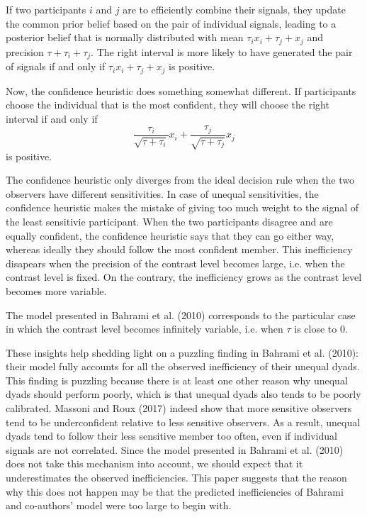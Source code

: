 \documentclass[12pt]{report}
\begin{document}
If two participants $i$ and $j$ are to efficiently combine their signals, they update the common prior belief based on the pair of individual signals, leading to a posterior belief that is normally distributed with mean $\tau_i x_i + \tau_j + x_j$ and precision $\tau + \tau_i + \tau_j$. The right interval is more likely to have generated the pair of signals if and only if $\tau_i x_i + \tau_j + x_j$ is positive. 

Now, the confidence heuristic does something somewhat different. If participants choose the individual that is the most confident, they will choose the right interval if and only if $$ \frac{\tau_i}{\sqrt{\tau+\tau_i}} x_i + \frac{\tau_j}{\sqrt{\tau+\tau_j}} x_j $$ is positive. 

The confidence heuristic only diverges from the ideal decision rule when the two observers have different sensitivities. In case of unequal sensitivities, the confidence heuristic makes the mistake of giving too much weight to the signal of the least sensitivie participant. When the two participants disagree and are equally confident, the confidence heuristic says that they can go either way, whereas ideally they should follow the most confident member. This inefficiency disapears when the precision of the contrast level becomes large, i.e. when the contrast level is fixed. On the contrary, the inefficiency grows as the contrast level becomes more variable. 

The model presented in Bahrami et al. (2010) corresponds to the particular case in which the contrast level becomes infinitely variable, i.e. when $\tau$ is close to 0. 

These insights help shedding light on a puzzling finding in Bahrami et al. (2010): their model fully accounts for all the observed inefficiency of their unequal dyads. This finding is puzzling because there is at least one other reason why unequal dyads should perform poorly, which is that unequal dyads also tends to be poorly calibrated. Massoni and Roux (2017) indeed show that more sensitive observers tend to be underconfident relative to less sensitive observers. As a result, unequal dyads tend to follow their less sensitive member too often, even if individual signals are not correlated. Since the model presented in Bahrami et al. (2010) does not take this mechanism into account, we should expect that it underestimates the observed inefficiencies. This paper suggests that the reason why this does not happen may be that the predicted inefficiencies of Bahrami and co-authors' model were too large to begin with. 
\end{document}
